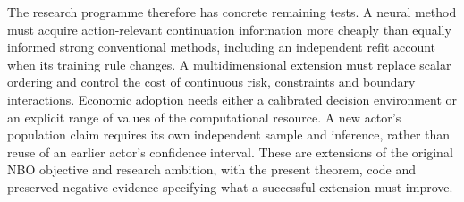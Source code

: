 The research programme therefore has concrete remaining tests. A neural
method must acquire action-relevant continuation information more cheaply
than equally informed strong conventional methods, including an independent
refit account when its training rule changes. A multidimensional extension
must replace scalar ordering and control the cost of continuous risk,
constraints and boundary interactions. Economic adoption needs either a
calibrated decision environment or an explicit range of values of the
computational resource. A new actor's population claim requires its own
independent sample and inference, rather than reuse of an earlier actor's
confidence interval. These are extensions of the original NBO objective
and research ambition, with the present theorem, code and preserved
negative evidence specifying what a successful extension must improve.
